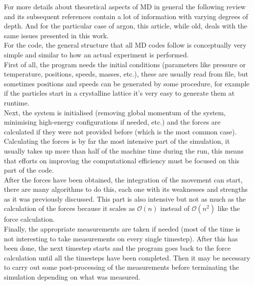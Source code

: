 \documentclass[11pt,a4paper,oneside]{article}
\begin{document}
		For more details about theoretical aspects of MD in general the following review\cite{understanding} and its subsequent references contain a lot of information with varying degrees of depth. And for the particular case of argon, this article\cite{argon}, while old, deals with the same issues presented in this work.\\
		
		For the code, the general structure that all MD codes follow is conceptually very simple and similar to how an actual experiment is performed.\\
		
		First of all, the program needs the initial conditions (parameters like pressure or temperature, positions, speeds, masses, etc.), these are usually read from file, but sometimes positions and speeds can be generated by some procedure, for example if the particles start in a crystalline lattice it's very easy to generate them at runtime.\\
		
		Next, the system is initialised (removing global momentum of the system, minimising high-energy configurations if needed, etc.) and the forces are calculated if they were not provided before (which is the most common case). Calculating the forces is by far the most intensive part of the simulation, it usually takes up more than half of the machine time during the run, this means that efforts on improving the computational efficiency must be focused on this part of the code.\\
		
		After the forces have been obtained, the integration of the movement can start, there are many algorithms to do this, each one with its weaknesses and strengths as it was previously discussed. This part is also intensive but not as much as the calculation of the forces because it scales as $\mathcal{O}\left(n\right)$ instead of $\mathcal{O}\left(n^2\right)$ like the force calculation.\\
		
		Finally, the appropriate measurements are taken if needed (most of the time is not interesting to take measurements on every single timestep). After this has been done, the next timestep starts and the program goes back to the force calculation until all the timesteps have been completed. Then it may be necessary to carry out some post-processing of the measurements before terminating the simulation depending on what was measured.\\
		
\end{document}
